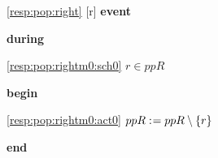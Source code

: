 \noindent \ref{resp:pop:right} [r] \textbf{event}
\begin{block}
  \item   \textbf{during}
  \begin{block}
  \item[ \eqref{resp:pop:rightm0:sch0} ]{$r \in ppR $} %
  \end{block}
  \item   \textbf{begin}
  \begin{block}
  \item[ \eqref{resp:pop:rightm0:act0} ]{$ppR \mathrel{:\mkern1mu=} ppR \setminus \{ r \} $} %
  \end{block}
  \item   \textbf{end} \\
\end{block}
